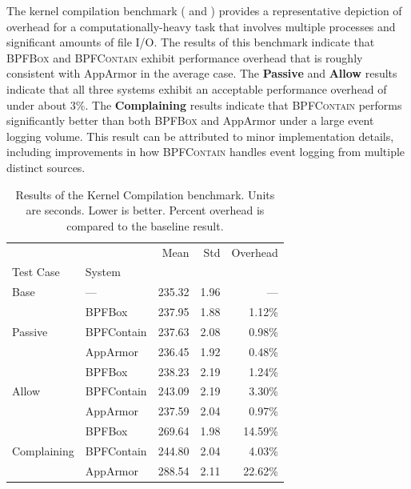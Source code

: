 \documentclass[
  fontsize=12pt,
  titlepage=firstiscover,
  paper=letter,
oneside,
  cleardoublepage=plain,
  parskip=half-,
  DIV=10,
  parindent,
  appendixprefix,
  chapterprefix,
  listof=totoc,
]{scrbook}
\newcommand{\bpfbox}{\textsc{BPFBox}}
\newcommand{\bpfcontain}{\textsc{BPFContain}}
\begin{document}
The kernel compilation benchmark ( and
) provides a representative depiction of overhead for
a computationally-heavy task that involves multiple processes and significant amounts of
file I/O. The results of this benchmark indicate that \bpfbox{} and \bpfcontain{} exhibit
performance overhead that is roughly consistent with AppArmor in the average case. The
\textbf{Passive} and \textbf{Allow} results indicate that all three systems exhibit an
acceptable performance overhead of under about $3\%$. The \textbf{Complaining} results
indicate that \bpfcontain{} performs significantly better than both \bpfbox{} and AppArmor
under a large event logging volume. This result can be attributed to minor implementation
details, including improvements in how \bpfcontain{} handles event logging from multiple
distinct sources.


\begin{table}[ht!]
\centering
\footnotesize
\caption[Results of the Kernel Compilation benchmark]{Results of the Kernel Compilation benchmark. Units are seconds. Lower is better. Percent overhead is compared to the baseline result.}
\label{tab:phoronix-kernel-compilation}
\begin{tabular}{llrrr}
\toprule
            &          &    Mean &   Std & Overhead \\
Test Case & System &         &       &          \\
\midrule
Base & --- &  235.32 &  1.96 &      --- \\
\cline{1-5}
\multirow{3}{*}{Passive} & BPFBox &  237.95 &  1.88 &   1.12\% \\
            & BPFContain &  237.63 &  2.08 &   0.98\% \\
            & AppArmor &  236.45 &  1.92 &   0.48\% \\
\cline{1-5}
\multirow{3}{*}{Allow} & BPFBox &  238.23 &  2.19 &   1.24\% \\
            & BPFContain &  243.09 &  2.19 &   3.30\% \\
            & AppArmor &  237.59 &  2.04 &   0.97\% \\
\cline{1-5}
\multirow{3}{*}{Complaining} & BPFBox &  269.64 &  1.98 &  14.59\% \\
            & BPFContain &  244.80 &  2.04 &   4.03\% \\
            & AppArmor &  288.54 &  2.11 &  22.62\% \\
\bottomrule
\end{tabular}
\end{table}
\end{document}
